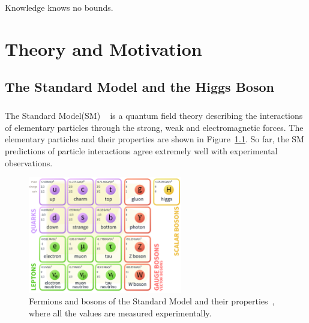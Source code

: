\begin{savequote}[75mm]
Knowledge knows no bounds.
\end{savequote}

\chapter{Theory and Motivation}

\section{The Standard Model and the Higgs Boson}
\paragraph{}
The Standard Model(SM) ~\cite{Pdg,Griffiths,Tully,Schwartz} is a quantum field theory describing the interactions of elementary particles through the strong, weak and electromagnetic forces. 
The elementary particles and their properties are shown in Figure~\ref{fig:SM}. 
So far, the SM predictions of particle interactions agree extremely well with experimental observations.

\begin{figure}[htbp!]
  \centering
  \captionsetup{justification=centering}
  \includegraphics[width=0.6\textwidth]{figures/theory/SM}
  \caption{Fermions and bosons of the Standard Model and their properties~\cite{Pdg}, where all the values are measured experimentally.}
  \label{fig:SM}
\end{figure}


